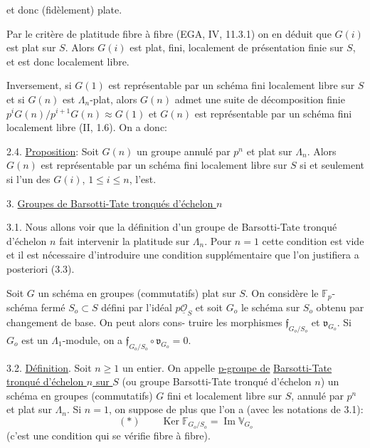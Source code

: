 \documentclass[11pt]{article}
\newcommand{\scanpage}[1]{\par\bigskip\noindent{\small\sffamily[scan #1]}\par}
\newcommand{\mspage}[1]{{\small\sffamily[p.\,#1]}}
\newcommand{\hand}[1]{\textcolor{blue}{#1}}
\newcommand{\uline}[1]{\underline{#1}}
\begin{document}
et donc (fidèlement) plate.

Par le critère de platitude fibre à fibre (EGA, IV, 11.3.1)
on en déduit que $G(i)$ est plat sur $S$. Alors $G(i)$ est plat, fini,
localement de présentation finie sur $S$, et est donc localement libre.

Inversement, si $G(1)$ est représentable par un schéma fini
localement libre sur $S$ et si $G(n)$ est $\Lambda_n$-plat, alors $G(n)$ admet
une suite de décomposition finie $p^iG(n)/p^{i+1}G(n) \approx G(1)$ et $G(n)$ est
représentable par un schéma fini localement libre (II, 1.6). On a donc:

2.4. \uline{Proposition}: Soit $G(n)$ un groupe annulé par $p^n$ et plat sur
$\Lambda_n$. Alors $G(n)$ est représentable par un schéma fini localement libre
sur $S$ si et seulement si l'un des $G(i)$, $1 \leq i \leq n$, l'est.

3. \uline{Groupes de Barsotti-Tate tronqués d'échelon $n$}

3.1. Nous allons voir que la définition d'un groupe de Barsotti-Tate
tronqué d'échelon $n$ fait intervenir la platitude sur $\Lambda_n$. Pour $n = 1$
cette condition est vide et il est nécessaire d'introduire une condition
supplémentaire que l'on justifiera a posteriori (3.3).

Soit $G$ un schéma en groupes (commutatifs) plat sur $S$. On
considère le $\mathbb{F}_p$-schéma fermé $S_o \subset S$ défini par l'idéal $p\underline{\mathcal{O}}_S$ et soit
$G_o$ le schéma sur $S_o$ obtenu par changement de base. On peut alors cons-%
truire les morphismes $\mathfrak{f}_{G_o/S_o}$ et $\mathfrak{v}_{G_o}$. Si $G_o$ est un $\Lambda_1$-module, on a
$\mathfrak{f}_{G_o/S_o} \circ \mathfrak{v}_{G_o} = 0$.

\mspage{\hand{60}}

\clearpage
\scanpage{129/61}
\mspage{III-6}

3.2. \uline{Définition}. Soit $n \geq 1$ un entier. On appelle \uline{p-groupe de}
\uline{Barsotti-Tate tronqué d'échelon $n$ sur $S$} (ou groupe Barsotti-Tate
tronqué d'échelon $n$) un schéma en groupes (commutatifs) $G$ fini et
localement libre sur $S$, annulé par $p^{n}$ et plat sur $\Lambda_{n}$. Si $n = 1$,
on suppose de plus que l'on a (avec les notations de 3.1):
\[
(*) \qquad \operatorname{Ker} \mathbb{F}_{G_{o}/S_{o}} = \operatorname{Im} \mathbb{V}_{G_{o}}
\]
(c'est une condition qui se vérifie fibre à fibre).
\end{document}
